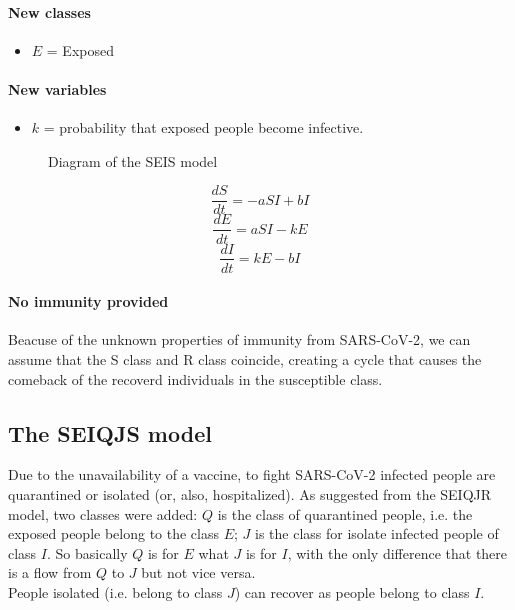 \documentclass[12pt]{llncs}
\begin{document}
\paragraph{New classes}
\begin{itemize}
\item $E$ = Exposed
\end{itemize}

\paragraph{New variables}
\begin{itemize}
\item $k$ = probability that exposed people become infective.
\end{itemize}

\begin{figure}
	\centering
    \caption{Diagram of the SEIS model}
\end{figure}

$$\frac{dS}{dt} = -aSI + bI$$
$$\frac{dE}{dt} = aSI - kE$$
$$\frac{dI}{dt} = kE - bI$$

\paragraph{\textbf{No immunity provided}}
Beacuse of the unknown properties of immunity from SARS-CoV-2, we can assume that the S class and R class coincide, creating a cycle that causes the comeback of the recoverd individuals in the susceptible class.

\subsection{The SEIQJS model}
Due to the unavailability of a vaccine, to fight SARS-CoV-2 infected people are quarantined or isolated (or, also, hospitalized). As suggested from the SEIQJR model, two classes were added: $Q$ is the class of quarantined people, i.e. the exposed people belong to the class $E$; $J$ is the class for isolate infected people of class $I$. So basically $Q$ is for $E$ what $J$ is for $I$, with the only difference that there is a flow from $Q$ to $J$ but not vice versa.\\
People isolated (i.e. belong to class $J$) can recover as people belong to class $I$.
\end{document}
